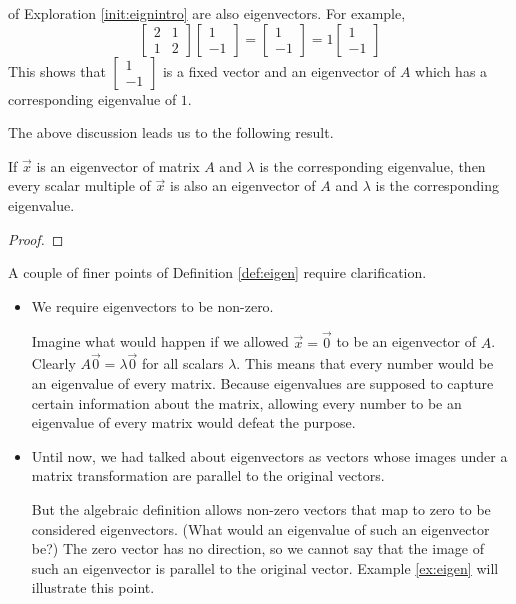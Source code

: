 \documentclass{ximera}
\begin{document}
 of Exploration \ref{init:eignintro} are also eigenvectors.
For example, 
$$\begin{bmatrix} 2& 1\\ 1&2 \end{bmatrix} \begin{bmatrix} 1\\ -1 \end{bmatrix} =
\begin{bmatrix} 1\\ -1 \end{bmatrix}= 1 \begin{bmatrix} 1\\ -1 \end{bmatrix}$$
This shows that $\begin{bmatrix} 1\\ -1 \end{bmatrix}$ is a fixed vector and an eigenvector of $A$ which has a corresponding eigenvalue of $1$.
    
The above discussion leads us to the following result.
    
\begin{theorem}\label{th:eigenScalarMult}
    If $\vec{x}$ is an eigenvector of matrix $A$ and $\lambda$ is the corresponding eigenvalue, then every scalar multiple of $\vec{x}$ is also an eigenvector of $A$
    and $\lambda$ is the corresponding eigenvalue.
\end{theorem}
\begin{proof}

\end{proof}
    
\begin{observation}\label{obs:finerPointsOfEigDef}
A couple of finer points of Definition \ref{def:eigen} require clarification.
    \begin{itemize}
    \item We require eigenvectors to be non-zero.  
    
    Imagine what would happen if we allowed $\vec{x}=\vec{0}$ to be an eigenvector of $A$. Clearly $A\vec{0}=\lambda\vec{0}$ for all scalars $\lambda$.  This means that every number would be an eigenvalue of every matrix.  Because eigenvalues are supposed to capture certain information about the matrix, allowing every number to be an eigenvalue of every matrix would defeat the purpose.
    \item Until now, we had talked about  eigenvectors as vectors whose images under a matrix transformation are parallel to the original vectors.  
    
    But the algebraic definition allows non-zero vectors that map to zero to be considered eigenvectors.  (What would an eigenvalue of such an eigenvector be?)  The zero vector has no direction, so we cannot say that the image of such an eigenvector is parallel to the original vector.  Example \ref{ex:eigen} will illustrate this point.
    \end{itemize}
\end{observation}
    
\end{document}
